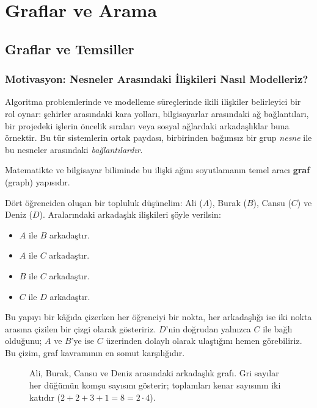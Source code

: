 \chapter[Graflar ve Arama · \textit{Orta}]{Graflar ve Arama}

\section{Graflar ve Temsiller}

\subsection{Motivasyon: Nesneler Arasındaki İlişkileri Nasıl Modelleriz?}
Algoritma problemlerinde ve modelleme süreçlerinde ikili ilişkiler belirleyici bir rol oynar: şehirler arasındaki kara yolları, bilgisayarlar arasındaki ağ bağlantıları, bir projedeki işlerin öncelik sıraları veya sosyal ağlardaki arkadaşlıklar buna örnektir. Bu tür sistemlerin ortak paydası, birbirinden bağımsız bir grup \emph{nesne} ile bu nesneler arasındaki \emph{bağlantılardır}.

Matematikte ve bilgisayar biliminde bu ilişki ağını soyutlamanın temel aracı \textbf{graf} (graph) yapısıdır.

Dört öğrenciden oluşan bir topluluk düşünelim: Ali ($A$), Burak ($B$), Cansu ($C$) ve Deniz ($D$). 
Aralarındaki arkadaşlık ilişkileri şöyle verilsin:
\begin{itemize}
    \item $A$ ile $B$ arkadaştır.
    \item $A$ ile $C$ arkadaştır.
    \item $B$ ile $C$ arkadaştır.
    \item $C$ ile $D$ arkadaştır.
\end{itemize}
Bu yapıyı bir kâğıda çizerken her öğrenciyi bir nokta, her arkadaşlığı ise iki nokta arasına çizilen bir çizgi olarak gösteririz. $D$'nin doğrudan yalnızca $C$ ile bağlı olduğunu; $A$ ve $B$'ye ise $C$ üzerinden dolaylı olarak ulaştığını hemen görebiliriz. Bu çizim, graf kavramının en somut karşılığıdır.

\begin{figure}[ht]
\centering
{}
\caption{Ali, Burak, Cansu ve Deniz arasındaki arkadaşlık grafı. Gri sayılar her
düğümün komşu sayısını gösterir; toplamları kenar sayısının iki katıdır
($2+2+3+1 = 8 = 2 \cdot 4$).}
\end{figure}

